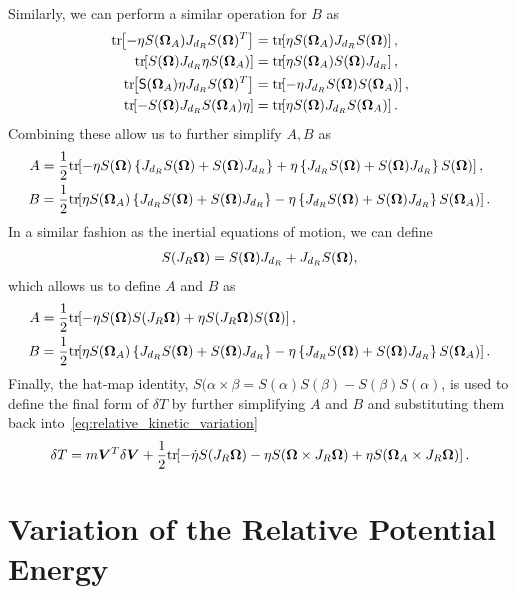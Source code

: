 Similarly, we can perform a similar operation for \( B \) as
\begin{align*}
    \tr{-\eta S(\vb{\Omega}_A) J_{d_{R}} S(\vb{\Omega})^T} &= \tr{\eta S(\vb{\Omega}_A) J_{d_{R}} S(\vb{\Omega})} , \\
    \tr{ S(\vb{\Omega}) J_{d_{R}} \eta S(\vb{\Omega}_A)} &= \tr{\eta S(\vb{\Omega}_A) S(\vb{\Omega}) J_{d_{R}}} , \\
    \tr{\S(\vb{\Omega}_A) \eta J_{d_{R}} S(\vb{\Omega})^T} &= \tr{-\eta J_{d_{R}} S(\vb{\Omega}) S(\vb{\Omega}_A)} , \\
    \tr{-S(\vb{\Omega}) J_{d_{R}} S(\vb{\Omega}_A) \eta} &= \tr{\eta S(\vb{\Omega}) J_{d_{R}} S(\vb{\Omega}_A)} .
\end{align*}
Combining these allow us to further simplify \( A,B \) as
\begin{align*}
    A &= \frac{1}{2} \mathrm{tr}\negthickspace\left[  -\eta S(\bm{\Omega}) \left\{ J_{d_{R}} S(\bm{\Omega}) + S(\bm{\Omega}) J_{d_{R}} \right\} + \eta \left\{ J_{d_{R}} S(\bm{\Omega}) + S(\bm{\Omega}) J_{d_{R}} \right\} S(\bm{\Omega}) \right] , \\
    B &= \frac{1}{2} \mathrm{tr}\negthickspace\left[  \eta S(\bm{\Omega}_A) \left\{ J_{d_{R}} S(\bm{\Omega}) + S(\bm{\Omega}) J_{d_{R}} \right\} - \eta \left\{ J_{d_{R}} S(\bm{\Omega}) + S(\bm{\Omega}) J_{d_{R}} \right\} S(\bm{\Omega}_A)  \right] .
\end{align*}
In a similar fashion as the inertial equations of motion, we can define
\begin{align}
    S(J_R \bm{\Omega}) = S(\bm{\Omega}) J_{d_{R}} + J_{d_{R}} S(\bm{\Omega}) , 
\end{align}
which allows us to define \( A \) and \( B \) as 
\begin{align*}
    A &= \frac{1}{2} \mathrm{tr}\negthickspace\left[  - \eta S(\bm{\Omega}) S(J_R \bm{\Omega}) + \eta S(J_R \bm{\Omega}) S(\bm{\Omega}) \right] , \\
    B &= \frac{1}{2} \mathrm{tr}\negthickspace\left[  \eta S(\bm{\Omega}_A) \left\{ J_{d_{R}} S(\bm{\Omega}) + S(\bm{\Omega}) J_{d_{R}} \right\} - \eta \left\{ J_{d_{R}} S(\bm{\Omega}) + S(\bm{\Omega}) J_{d_{R}}  \right\} S(\bm{\Omega}_A) \right] .
\end{align*}
Finally, the hat-map identity, \( S(\alpha \times \beta  = S(\alpha) S(\beta) - S(\beta) S(\alpha)\), is used to define the final form of \(\delta T\) by further simplifying \( A \) and \(B \) and substituting them back into~\cref{eq:relative_kinetic_variation} 
\begin{align}\label{eq:deltaT_relative}
    \delta T = m \bm{V}^T \delta \bm{V} + \frac{1}{2} \mathrm{tr}\negthickspace\left[ - \dot{\eta} S(J_R \bm{\Omega}) - \eta S(\bm{\Omega} \times J_R \bm{\Omega}) + \eta S(\bm{\Omega}_A \times J_R \bm{\Omega}) \right] .
\end{align}


\section{Variation of the Relative Potential Energy}\label{sec:relative_potential_energy}
